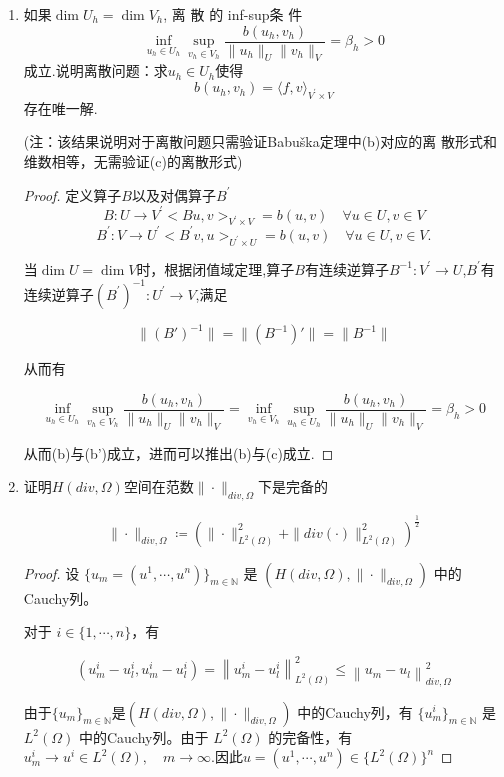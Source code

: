 \documentclass[12pt,a4paper]{article}
\begin{document}
\begin{enumerate}
\begin{proof}
			
		\end{proof}
		\item 如果$\dim U_h= \dim V_h$, 离 散 的 inf-sup条 件 
		$$\inf_{u_h\in U_h}\sup_{v_h\in V_h}\frac{b(u_h,v_h)}{\|u_h\|_U\|v_h\|_V}=\beta_h>0$$
		成立.说明离散问题：求$u_h\in U_h$使得
		$$b(u_h,v_h)=\langle f,v\rangle_{V^{\prime}\times V}$$
		存在唯一解.
		
		(注：该结果说明对于离散问题只需验证Babuška定理中(b)对应的离
		散形式和维数相等，无需验证(c)的离散形式) 
		
		\begin{proof}
			定义算子$B$以及对偶算子$B^\prime$
			$$
			B:U\to V^{\prime}<Bu,v>_{V^{\prime}\times V}=b(u,v)\quad\forall u\in U,v\in V$$
			$$B^{\prime}:V\to U^{\prime}<B^{\prime}v,u>_{U^{\prime}\times U}=b(u,v)\quad\forall u\in U,v\in V.
			$$
			
			当$\dim U= \dim V$时，根据闭值域定理,算子$B$有连续逆算子${B}^{-1} :V^\prime \rightarrow U$,$B^\prime$有连续逆算子${(B^\prime)}^{-1} :U^\prime \rightarrow V$,满足
			
			$$
			\|(B')^{-1}\|=\|(B^{-1})'\|=\|B^{-1}\|
			$$
			
			从而有
			
			$$\inf_{u_h\in U_h}\sup_{v_h\in V_h}\frac{b(u_h,v_h)}{\|u_h\|_U\|v_h\|_V}=\inf_{v_h\in V_h}\sup_{u_h\in U_h}\frac{b(u_h,v_h)}{\|u_h\|_U\|v_h\|_V}=\beta_h>0$$
			
			从而(b)与(b')成立，进而可以推出(b)与(c)成立.
			
		\end{proof}
		\item 证明$H(div,\Omega)$空间在范数$\|\cdot\|_{div,\Omega}$下是完备的
		
		$$\|\cdot\|_{div,\Omega} \coloneqq (\|\cdot\|_{L^2(\Omega)}^2 + \|div(\cdot)\|_{L^2(\Omega)}^2)^{\frac{1}{2}}$$
		
		\begin{proof}
			设 $\{u_m=(u^1,\cdots,u^n)\}_{m\in\mathbb{N}}$ 是 $(H(div,\Omega),\|\cdot\|_{div,\Omega})$ 中的Cauchy列。
			
			对于 $i\in\{1,\cdots,n\}$，有
			
			$$(u_m^i-u_l^i,u_m^i-u_l^i)=\left\|u_m^i-u_l^i\right\|_{L^2(\Omega)}^2\leq\left\|u_m-u_l\right\|_{div,\Omega}^2$$
			
			由于$\{u_m\}_{m\in\mathbb{N}}$是$(H(div,\Omega),\|\cdot\|_{div,\Omega})$ 中的Cauchy列，有 $\{u_m^i\}_{m\in\mathbb{N}}$ 是 $L^2(\Omega)$ 中的Cauchy列。由于 $L^2(\Omega)$ 的完备性，有 $u_m^i\to u^i\in L^2(\Omega), \quad m\to\infty$.因此$u=(u^1,\cdots,u^n)\in\{L^2(\Omega)\}^n$
			

\end{proof}
\end{enumerate}
\end{document}
